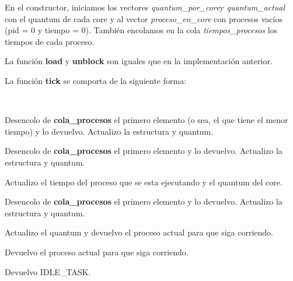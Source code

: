 En el constructor, iniciamos los vectores \emph{quantum\_por\_core}y \emph{quantum\_actual} con el quantum de cada core y al vector \emph{proceso\_en\_core} con procesos vacíos (pid = 0 y tiempo = 0). También encolamos en la cola \emph{tiempos\_procesos} los tiempos de cada proceso.

La función \textbf{load} y \textbf{unblock} son iguales que en la implementación anterior.

La función \textbf{tick} se comporta de la siguiente forma:

~

\begin{algorithmic}

		\State Desencolo de \textbf{cola\_procesos} el primero elemento (o sea, el que tiene el menor tiempo) y lo devuelvo.
		\State Actualizo la estructura y quantum.
	
		\State Desencolo de \textbf{cola\_procesos} el primero elemento y lo devuelvo.
		\State Actualizo la estructura y quantum.

		\State Actualizo el tiempo del proceso que se esta ejecutando y el quantum del core.

			\State Desencolo de \textbf{cola\_procesos} el primero elemento y lo devuelvo.
			\State Actualizo la estructura y quantum.

			\State Actualizo el quantum y devuelvo el proceso actual para que siga corriendo.

		\Else
			\State Devuelvo el proceso actual para que siga corriendo.
		\EndIf

	\Else
		\State Devuelvo IDLE\_TASK.
	\EndIf
\EndFunction	
\end{algorithmic}
